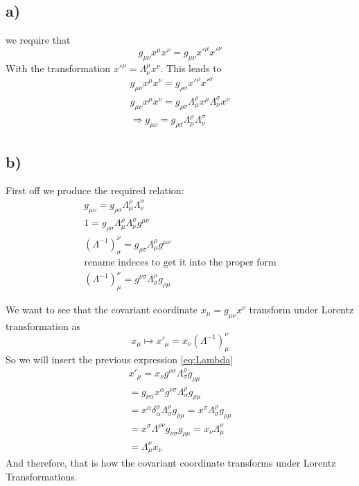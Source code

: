 \documentclass[]{scrartcl}
\begin{document}
\subsection{a)}
we require that
$$
g_{\mu\nu} x^\mu x^\nu = g_{\mu\nu} x'^\mu x'^\nu
$$
With the transformation $x'^\mu = \Lambda^\mu_\nu x^\nu$. This leads to
\begin{gather*}
	g_{\mu\nu}x^\mu x^\nu = g_{\rho\sigma} x'^\rho x'^\sigma\\
	g_{\mu\nu}x^\mu x^\nu = g_{\rho\sigma} \Lambda^\rho_\mu x^\mu \Lambda^\sigma_\nu x^\nu\\
	\Rightarrow g_{\mu\nu} = g_{\rho\sigma} \Lambda^\rho_\mu \Lambda^\sigma_\nu
\end{gather*}

\subsection{b)}
First off we produce the required relation:
\begin{gather}
	g_{\mu\nu} = g_{\rho\sigma}\Lambda^\rho_\mu\Lambda^\sigma_\nu\nonumber\\
	1 = g_{\rho\sigma}\Lambda^\rho_\mu\Lambda^\sigma_\nu g^{\mu\nu}\nonumber\\
	(\Lambda^{-1})^\nu_\sigma = g_{\rho\sigma}\Lambda^\rho_\mu g^{\mu\nu}\nonumber\\
	\text{rename indeces to get it into the proper form}\nonumber\\
	(\Lambda^{-1})^\nu_\mu = g^{\nu\sigma}\Lambda^\rho_\sigma g_{\rho\mu}\label{eq:Lambda}
\end{gather}

We want to see that the covariant coordinate $x_\mu = g_{\mu\nu}x^\nu$ transform under Lorentz transformation as
$$
x_\mu \mapsto x'_\mu = x_\nu (\Lambda^{-1})^\nu_\mu
$$
So we will insert the previous expression \ref{eq:Lambda}
\begin{gather}
	x'_\mu = x_\nu g^{\nu\sigma}\Lambda^\rho_\sigma g_{\rho\mu}\\
	= g_{\nu\alpha}x^\alpha g^{\nu\sigma}\Lambda^\rho_\sigma g_{\rho\mu}\\
	= x^\alpha \delta^\sigma_\alpha \Lambda^\rho_\sigma g_{\rho\mu} = x^\sigma \Lambda^\rho_\sigma g_{\rho\mu}\\
	= x^\sigma \Lambda^{\rho\nu}g_{\nu\sigma}g_{\rho\mu} = x_\nu\Lambda^\nu_\mu\\
	= \Lambda^\nu_\mu x_\nu
\end{gather}
And therefore, that is how the covariant coordinate transforms under Lorentz Transformations.
\end{document}
